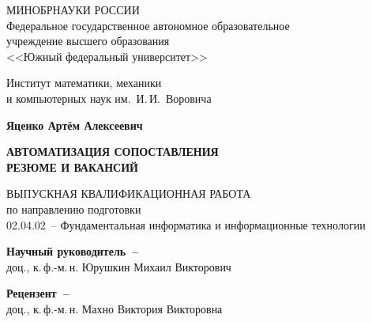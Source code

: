 


\thispagestyle{empty}
\begin{singlespacing}
    \begin{center}

        МИНОБРНАУКИ РОССИИ\\ [12pt]
        Федеральное государственное автономное образовательное\\
        учреждение высшего образования\\
        <<Южный федеральный университет>>

        \vspace{\baselineskip}
        Институт математики, механики\\
        и компьютерных наук им.~И.\,И.~Воровича


        \vfill
        \textbf{Яценко Артём Алексеевич}

        \vspace{15mm}
        {\bf АВТОМАТИЗАЦИЯ СОПОСТАВЛЕНИЯ \\
            РЕЗЮМЕ И ВАКАНСИЙ}

        \vspace{15mm}
        ВЫПУСКНАЯ КВАЛИФИКАЦИОННАЯ РАБОТА\\
        по направлению подготовки\\
        02.04.02~-- Фундаментальная информатика и информационные технологии

        \vspace{10mm}
        \textbf{Научный руководитель~--}\\
        доц., к.\,ф.-м.\,н. Юрушкин Михаил Викторович

        \vspace{7mm}
        \textbf{Рецензент~--}\\
        доц., к.\,ф.-м.\,н. Махно Виктория Викторовна



\end{center}
\end{singlespacing}
